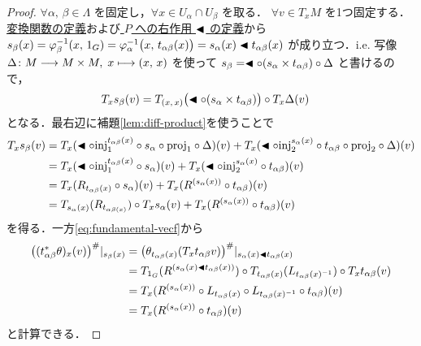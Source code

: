 \documentclass[TQFT_main]{subfiles}
\begin{document}
\begin{proof}
    $\forall \alpha,\, \beta \in \Lambda$ を固定し，$\forall x \in U_\alpha \cap U_\beta$ を取る．
    $\forall v \in T_x M$ を1つ固定する．
    \hyperref[def.fiber-1]{変換関数の定義}および\hyperref[prop.PFD_right]{ $P$ への右作用 $\blacktriangleleft$ の定義}から $s_\beta (x) = \varphi_\beta^{-1}(x,\, 1_G) = \varphi_\alpha^{-1}\bigl(x,\, t_{\alpha\beta}(x)\bigr) = s_\alpha(x) \blacktriangleleft t_{\alpha\beta}(x)$ が成り立つ．i.e. \cinfty 写像 $\Delta \colon M \longrightarrow M \times M,\; x \longmapsto (x,\, x)$ を使って $s_\beta = \blacktriangleleft \circ (s_\alpha \times t_{\alpha\beta}) \circ \Delta$ と書けるので，
    \begin{align}
        T_x s_\beta (v)
        &= T_{(x,\, x)} \bigl(\blacktriangleleft \circ (s_\alpha \times t_{\alpha\beta})\bigr) \circ T_x\Delta (v)
    \end{align}
    となる．最右辺に補題\ref{lem:diff-product}を使うことで
    \begin{align}
        T_x s_\beta(v)
        &= T_x (\blacktriangleleft \circ \mathrm{inj}_1^{t_{\alpha\beta}(x)} \circ s_\alpha \circ \mathrm{proj}_1 \circ \Delta )(v)
        + T_x (\blacktriangleleft \circ \mathrm{inj}_2^{s_\alpha(x)} \circ t_{\alpha\beta} \circ \mathrm{proj}_2 \circ \Delta )(v) \\
        &= T_x (\blacktriangleleft \circ \mathrm{inj}_1^{t_{\alpha\beta}(x)} \circ s_\alpha )(v)
        + T_x (\blacktriangleleft \circ \mathrm{inj}_2^{s_\alpha(x)} \circ t_{\alpha\beta} )(v) \\
        &= T_x (R_{t_{\alpha\beta}(x)} \circ s_\alpha)(v)
        + T_x (R^{(s_\alpha(x))} \circ t_{\alpha\beta})(v) \\
        &= T_{s_\alpha(x)} (R_{t_{\alpha\beta(x)}}) \circ T_{x} s_\alpha (v)
        + T_{x} (R^{(s_\alpha(x))} \circ t_{\alpha\beta}) (v)
    \end{align}
    を得る．一方\eqref{eq:fundamental-vecf}から
    \begin{align}
        \bigl((t_{\alpha\beta}^* \theta)_x (v) \bigr)^\#|_{s_\beta(x)}
        &= \bigl( \theta_{t_{\alpha\beta}(x)}(T_{x} t_{\alpha\beta} v) \bigr)^\#|_{s_\alpha(x) \blacktriangleleft t_{\alpha\beta}(x)} \\
        &= T_{1_G} ( R^{(s_\alpha(x) \blacktriangleleft t_{\alpha\beta}(x) )} ) \circ T_{t_{\alpha\beta}(x)}(L_{t_{\alpha\beta}(x)^{-1}}) \circ T_{x} t_{\alpha\beta} (v) \\
        &= T_{x} ( R^{(s_\alpha(x))} \circ L_{t_{\alpha\beta}(x)} \circ L_{t_{\alpha\beta}(x)^{-1}} \circ t_{\alpha\beta}) (v) \\
        &= T_{x} ( R^{(s_\alpha(x))} \circ t_{\alpha\beta}) (v)
    \end{align}
    と計算できる．    
\end{proof}
\end{document}
